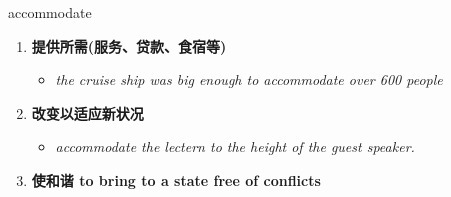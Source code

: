 
\begin{frame}
{\huge accommodate}
\begin{center}
\begin{enumerate}\Large
  \item \textbf{提供所需(服务、贷款、食宿等)}
  \begin{itemize}
    \item \em{\Large{the cruise ship was big enough to accommodate over 600 people}}
  \end{itemize}
  \item \textbf{改变以适应新状况}
  \begin{itemize}
    \item \em{\Large{accommodate the lectern to the height of the guest speaker.}}
  \end{itemize}
  \item \textbf{使和谐 to bring to a state free of conflicts}
\end{enumerate}
\end{center}
\end{frame}
